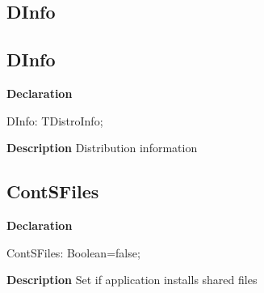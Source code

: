 \documentclass{report}
\newif\ifpdf
\begin{document}
\subsection*{\large{\textbf{DInfo}}\normalsize\hspace{1ex}\hrulefill}
\else
\subsection*{DInfo}
\fi
\label{mainunit-DInfo}
\begin{list}{}{
\setlength{\itemindent}{0cm}
\setlength{\listparindent}{0cm}
\setlength{\leftmargin}{\evensidemargin}
\addtolength{\leftmargin}{\tmplength}
\settowidth{\labelsep}{X}
\addtolength{\leftmargin}{\labelsep}
\setlength{\labelwidth}{\tmplength}
}
\item[\textbf{Declaration}\hfill]
\ifpdf
\begin{flushleft}
\fi
\begin{ttfamily}
DInfo: TDistroInfo;\end{ttfamily}

\ifpdf
\end{flushleft}
\fi

\par
\item[\textbf{Description}]
Distribution information

\end{list}
\ifpdf
\subsection*{\large{\textbf{ContSFiles}}\normalsize\hspace{1ex}\hrulefill}
\else
\subsection*{ContSFiles}
\fi
\label{mainunit-ContSFiles}
\begin{list}{}{
\setlength{\itemindent}{0cm}
\setlength{\listparindent}{0cm}
\setlength{\leftmargin}{\evensidemargin}
\addtolength{\leftmargin}{\tmplength}
\settowidth{\labelsep}{X}
\addtolength{\leftmargin}{\labelsep}
\setlength{\labelwidth}{\tmplength}
}
\item[\textbf{Declaration}\hfill]
\ifpdf
\begin{flushleft}
\fi
\begin{ttfamily}
ContSFiles: Boolean=false;\end{ttfamily}

\ifpdf
\end{flushleft}
\fi

\par
\item[\textbf{Description}]
Set if application installs shared files

\end{list}
\end{document}
